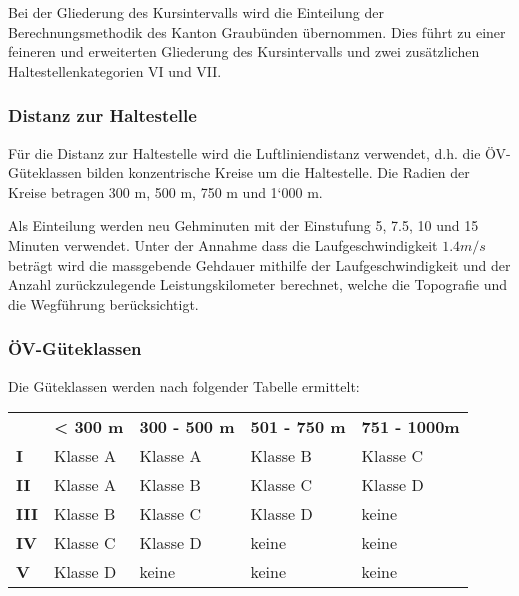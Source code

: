 Bei der Gliederung des Kursintervalls wird die Einteilung der Berechnungsmethodik des Kanton Graubünden übernommen.
Dies führt zu einer feineren und erweiterten Gliederung des Kursintervalls und zwei zusätzlichen Haltestellenkategorien VI und VII.

\subsubsection{Distanz zur Haltestelle}
\label{Zusammenhang zur Berechnungsmethodik ARE:Distanz zur Haltestelle}

\begin{itquote}
Für die Distanz zur Haltestelle wird die Luftliniendistanz verwendet, d.h. die ÖV-Güteklassen bilden konzentrische Kreise um die Haltestelle.
Die Radien der Kreise betragen 300 m, 500 m, 750 m und 1‘000 m.
\end{itquote}

Als Einteilung werden neu Gehminuten mit der Einstufung 5, 7.5, 10 und 15 Minuten verwendet.
Unter der Annahme dass die Laufgeschwindigkeit $1.4 m/s$ beträgt wird die massgebende Gehdauer mithilfe der Laufgeschwindigkeit und der Anzahl zurückzulegende \gls{Leistungskilometer} berechnet, welche die Topografie und die Wegführung berücksichtigt. 

\subsubsection{ÖV-Güteklassen}
\label{Zusammenhang zur Berechnungsmethodik ARE:ÖV-Güteklassen}

\begin{itquote}
Die Güteklassen werden nach folgender Tabelle ermittelt:
\begin{longtable}[c]{l p{2.9cm} p{2.9cm} p{2.9cm} p{2.9cm}}
    \midrule
    \textbf{}
                            & \textbf{< 300 m}
                            & \textbf{300 - 500 m}
                            & \textbf{501 - 750 m}
                            & \textbf{751 - 1000m}\\
    \textbf{I}
                            & Klasse A
                            & Klasse A
                            & Klasse B
                            & Klasse C\\
    \textbf{II}
                            & Klasse A
                            & Klasse B
                            & Klasse C
                            & Klasse D\\
    \textbf{III}
                            & Klasse B
                            & Klasse C
                            & Klasse D
                            & keine\\
    \textbf{IV}
                            & Klasse C
                            & Klasse D
                            & keine
                            & keine\\
    \textbf{V}
                            & Klasse D
                            & keine
                            & keine
                            & keine\\
    \bottomrule
\end{longtable}
\end{itquote}

